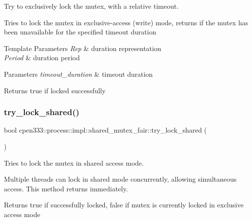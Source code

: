 Try to exclusively lock the mutex, with a relative timeout. 

Tries to lock the mutex in exclusive-\/access (write) mode, returns if the mutex has been unavailable for the specified timeout duration


\begin{DoxyTemplParams}{Template Parameters}
{\em Rep} & duration representation \\
\hline
{\em Period} & duration period \\
\hline
\end{DoxyTemplParams}

\begin{DoxyParams}{Parameters}
{\em timeout\+\_\+duration} & timeout duration \\
\hline
\end{DoxyParams}
\begin{DoxyReturn}{Returns}
true if locked successfully 
\end{DoxyReturn}
\mbox{\label{classcpen333_1_1process_1_1impl_1_1shared__mutex__fair_a1d1a77e135745777f6476fe0abcca078}} 
\subsubsection{\texorpdfstring{try\+\_\+lock\+\_\+shared()}{try\_lock\_shared()}}
{\footnotesize\ttfamily bool cpen333\+::process\+::impl\+::shared\+\_\+mutex\+\_\+fair\+::try\+\_\+lock\+\_\+shared (\begin{DoxyParamCaption}{ }\end{DoxyParamCaption})\hspace{0.3cm}{\ttfamily [inline]}}



Tries to lock the mutex in shared access mode. 

Multiple threads can lock in shared mode concurrently, allowing simultaneous access. This method returns immediately.

\begin{DoxyReturn}{Returns}
true if successfully locked, false if mutex is currently locked in exclusive access mode 
\end{DoxyReturn}
\mbox{\label{classcpen333_1_1process_1_1impl_1_1shared__mutex__fair_a0927a5897a261f5eb992eb442145fdf5}} 

